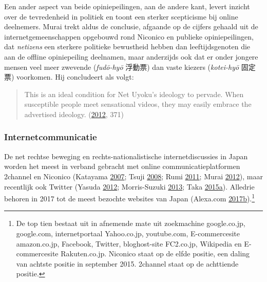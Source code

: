 \documentclass[10.5pt,dutch,]{article}
\begin{document}
Een ander aspect van beide opiniepeilingen, aan de andere kant, levert
inzicht over de tevredenheid in politiek en toont een sterker
scepticisme bij online deelnemers. Murai trekt aldus de conclusie,
afgaande op de cijfers gehaald uit de internetgemeenschappen opgebouwd
rond Niconico en publieke opiniepeilingen, dat \emph{netizens} een
sterkere politieke bewustheid hebben dan leeftijdsgenoten die aan de
offline opiniepeiling deelnamen, maar anderzijds ook dat er onder
jongere mensen veel meer zwevende (\emph{fudō-hyō} 浮動票) dan vaste
kiezers (\emph{kotei-hyō} 固定票) voorkomen. Hij concludeert als volgt:

\begin{quote}
This is an ideal condition for Net Uyoku's ideology to pervade. When
susceptible people meet sensational videos, they may easily embrace the
advertised ideology.
(\protect\hyperlink{ref-muraiux5fnetux5f2012}{2012}, 371)
\end{quote}

\subsubsection{Internetcommunicatie}\label{internetcommunicatie}

De net rechtse beweging en rechts-nationalistische internetdiscussies in
Japan worden het meest in verband gebracht met online
communicatieplatformen 2channel en Niconico (Katayama
\protect\hyperlink{ref-katayamaux5f2-channelux5f2007}{2007}; Tsuji
\protect\hyperlink{ref-tsujiux5fintanettoux5f2008}{2008}; Rumi
\protect\hyperlink{ref-rumiux5fkoreansux5f2011}{2011}; Murai
\protect\hyperlink{ref-muraiux5fnetux5f2012}{2012}), maar recentlijk ook
Twitter (Yasuda \protect\hyperlink{ref-yasudaux5fnettoux5f2012}{2012};
Morris-Suzuki
\protect\hyperlink{ref-morris-suzukiux5ffreedomux5f2013}{2013}; Taka
\protect\hyperlink{ref-takaux5ftwitterux5f2015-1}{2015}\protect\hyperlink{ref-takaux5ftwitterux5f2015-1}{a}).
Alledrie behoren in 2017 tot de meest bezochte websites van Japan
(Alexa.com
\protect\hyperlink{ref-alexa.comux5ftopux5f2017}{2017}\protect\hyperlink{ref-alexa.comux5ftopux5f2017}{b}).\footnote{De
  top tien bestaat uit in afnemende mate uit zoekmachine google.co.jp,
  google.com, internetportaal Yahoo.co.jp, youtube.com, E-commercesite
  amazon.co.jp, Facebook, Twitter, bloghost-site FC2.co.jp, Wikipedia en
  E-commercesite Rakuten.co.jp. Niconico staat op de elfde positie, een
  daling van achtste positie in september 2015. 2channel staat op de
  achttiende positie.}
\end{document}
